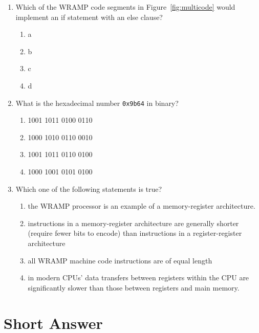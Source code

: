 \documentclass[a4paper,10pt]{article}
\begin{document}
\begin{enumerate}
\item 
\label{ques:multicodeend}
Which of the WRAMP code segments in Figure~\ref{fig:multicode}
would implement an if statement with an else clause?
\begin{enumerate}
  \item a
  \item b
  \item c
  \item d
\end{enumerate}

\newpage
\item What is the hexadecimal number \texttt{0x9b64} in binary?
\begin{enumerate}
  \item 1001 1011 0100 0110
  \item 1000 1010 0110 0010
  \item 1001 1011 0110 0100
  \item 1000 1001 0101 0100
\end{enumerate}

\item Which one of the following statements is true?
\begin{enumerate}
  \item the WRAMP processor is an example of a memory-register architecture.
  \item instructions in a memory-register architecture are generally
   shorter (require fewer bits to encode) than instructions in a
   register-register architecture 
  \item all WRAMP machine code instructions are of equal length
  \item in modern CPUs' data transfers between registers within the
  CPU are significantly slower than those between registers and main
  memory. 
\end{enumerate}

\end{enumerate}

\section{Short Answer}
\end{document}
